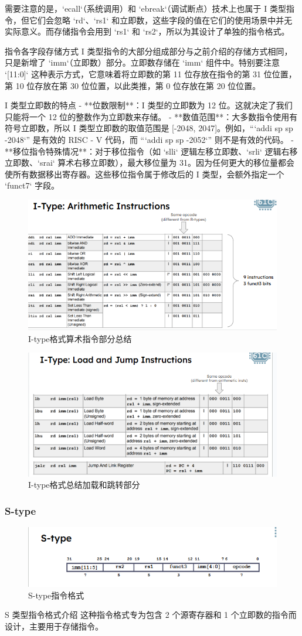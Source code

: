 \documentclass{ctexart}
\begin{document}
需要注意的是，`ecall`（系统调用）和 `ebreak`（调试断点）技术上也属于 I 类型指令，但它们会忽略 `rd`、`rs1` 和立即数，这些字段的值在它们的使用场景中并无实际意义。而存储指令会用到 `rs1` 和 `rs2`，所以为其设计了单独的指令格式。

 指令各字段存储方式
I 类型指令的大部分组成部分与之前介绍的存储方式相同，只是新增了 `imm`（立即数）部分。立即数存储在 `imm` 组件中。特别要注意 `[11:0]` 这种表示方式，它意味着将立即数的第 11 位存放在指令的第 31 位位置，第 10 位存放在第 30 位位置，以此类推，第 0 位存放在第 20 位位置。

 I 类型立即数的特点
- **位数限制**：I 类型的立即数为 12 位。这就决定了我们只能将一个 12 位的整数作为立即数来存储。
- **数值范围**：大多数指令使用有符号立即数，所以 I 类型立即数的取值范围是 [-2048, 2047]。例如，“`addi sp sp -2048`” 是有效的 RISC - V 代码，而 “`addi sp sp -2052`” 则不是有效的代码。
- **移位指令特殊情况**：对于移位指令（如 `slli` 逻辑左移立即数、`srli` 逻辑右移立即数、`srai` 算术右移立即数），最大移位量为 31。因为任何更大的移位量都会使所有数据移出寄存器。这些移位指令属于修改后的 I 类型，会额外指定一个 `funct7` 字段。 \par
\begin{figure}
    \centering
    \includegraphics[width=0.5\linewidth]{I-type格式总结.png}
    \caption{I-type格式算术指令部分总结}
    \label{fig:enter-label}
\end{figure}
\begin{figure}
    \centering
    \includegraphics[width=0.5\linewidth]{I-type格式总结加载和跳转部分.png}
    \caption{I-type格式总结加载和跳转部分}
    \label{fig:enter-label}
\end{figure}
\subsubsection{S-type}
\begin{figure}
    \centering
    \includegraphics[width=0.5\linewidth]{S-type指令格式.png}
    \caption{S-type指令格式}
    \label{fig:enter-label}
\end{figure}
 S 类型指令格式介绍
这种指令格式专为包含 2 个源寄存器和 1 个立即数的指令而设计，主要用于存储指令。
\end{document}
